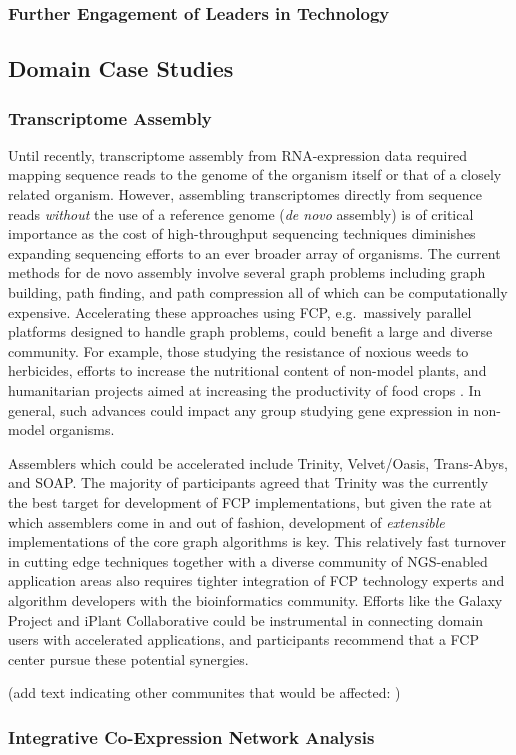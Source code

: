 \subsubsection{Further Engagement of Leaders in Technology}

\subsection{Domain Case Studies}

\subsubsection{Transcriptome Assembly}

Until recently, transcriptome assembly from RNA-expression data required mapping sequence reads to the genome of the organism itself or that of a closely related organism. However, assembling transcriptomes directly from sequence reads \textit{without} the use of a reference genome (\textit{de novo} assembly) is of critical importance as the cost of high-throughput sequencing techniques diminishes  expanding sequencing efforts to an ever broader array of organisms.  The current methods for de novo assembly involve several graph problems including graph building, path finding, and path compression all of which can be computationally expensive. Accelerating these approaches using FCP, e.g.\ massively parallel platforms designed to handle graph problems, could benefit a large and diverse community. For example, those studying the resistance of noxious weeds to herbicides\cite{1k_plant}, 
efforts to increase the nutritional content of non-model plants\cite[e.g.]{safflower, chickpea}, 
and humanitarian projects aimed at increasing the productivity of food crops \cite{rice}. In general, such advances could impact any group studying gene expression in non-model organisms.

Assemblers which could be accelerated include Trinity, Velvet/Oasis, Trans-Abys, and SOAP. The majority of participants agreed that Trinity was the currently the best target for development of FCP implementations, but given the rate at which assemblers come in and out of fashion, development of \textit{extensible} implementations of the core graph algorithms is key. This relatively fast turnover in cutting edge techniques together with a diverse community of NGS-enabled application areas also requires tighter integration of FCP technology experts and algorithm developers with the bioinformatics community.
Efforts like the Galaxy Project and iPlant Collaborative could be instrumental in connecting domain users with accelerated applications, and participants recommend that a FCP center pursue these potential synergies. 

(add text indicating other communites that would be affected:  \cite{1k_plant, 1k_insect, 1k_fish})

\subsubsection{Integrative Co-Expression Network Analysis}

